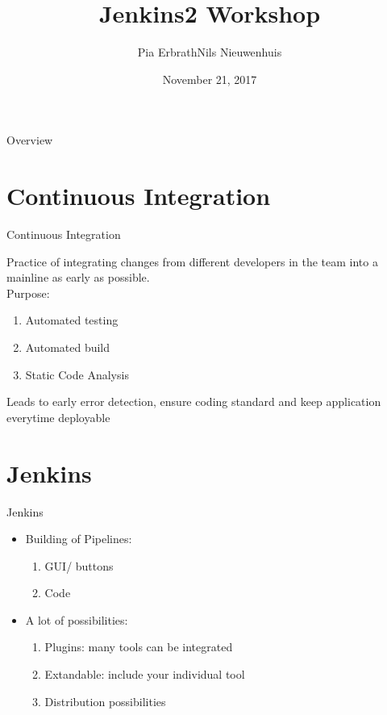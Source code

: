 \documentclass[utf8, a4paper]{beamer}
\title
  [Jenkins2]
  {Jenkins2 Workshop}
\author
  [Erbrath, Nieuwnhuis]
  {Pia Erbrath\quad Nils Nieuwenhuis}
\date
  {November 21, 2017}
\institute
  {SeBi Venlo}
\begin{document}
\maketitle

\begin{frame}{Overview}

  \tableofcontents

\end{frame}

\section{Continuous Integration}

\begin{frame}
  {Continuous Integration}

Practice of integrating changes from different developers in the team into a mainline as early as possible. \\
Purpose:
			\begin{enumerate}
			\item Automated testing
			\item Automated build
			\item Static Code Analysis
			\end{enumerate}
Leads to early error detection, ensure coding standard and keep application everytime deployable

\end{frame}

\section{Jenkins}
\begin{frame}
	{Jenkins}
	\begin{itemize}
		\item Building of Pipelines:
			\begin{enumerate}
			\item GUI/ buttons
			\item Code
			\end{enumerate}
		\item A lot of possibilities:
			\begin{enumerate}
			\item Plugins: many tools can be integrated
			\item Extandable: include your individual tool
			\item Distribution possibilities
			\end{enumerate}
	\end{itemize}
	
\end{frame}
\end{document}
